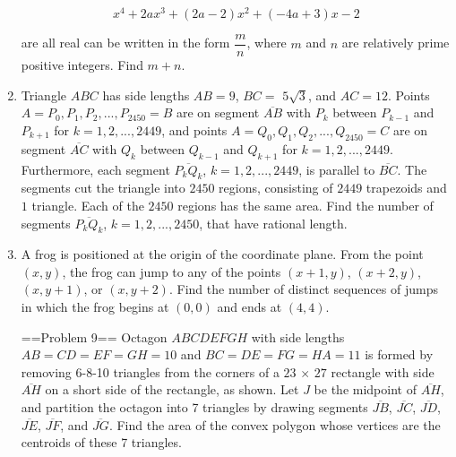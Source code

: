 \documentclass{article}
\begin{document}
\begin{enumerate}[label=\arabic*., itemsep=0.5em]
\begin{equation*}
x^4 + 2ax^3 + (2a - 2)x^2 + (-4a + 3)x - 2
\end{equation*}


are all real can be written in the form $\dfrac{m}{n}$, where $m$ and $n$ are relatively prime positive integers. Find $m + n$.\par \vspace{0.5em}\item Triangle $ABC$ has side lengths $AB = 9$, $BC =$ $5\sqrt{3}$, and $AC = 12$. Points $A = P_{0}, P_{1}, P_{2}, ... , P_{2450} = B$ are on segment $\overline{AB}$ with $P_{k}$ between $P_{k-1}$ and $P_{k+1}$ for $k = 1, 2, ..., 2449$, and points $A = Q_{0}, Q_{1}, Q_{2}, ... , Q_{2450} = C$ are on segment $\overline{AC}$ with $Q_{k}$ between $Q_{k-1}$ and $Q_{k+1}$ for $k = 1, 2, ..., 2449$. Furthermore, each segment $\overline{P_{k}Q_{k}}$, $k = 1, 2, ..., 2449$, is parallel to $\overline{BC}$. The segments cut the triangle into $2450$ regions, consisting of $2449$ trapezoids and $1$ triangle. Each of the $2450$ regions has the same area. Find the number of segments $\overline{P_{k}Q_{k}}$, $k = 1, 2, ..., 2450$, that have rational length.\par \vspace{0.5em}\item A frog is positioned at the origin of the coordinate plane. From the point $(x, y)$, the frog can jump to any of the points $(x + 1, y)$, $(x + 2, y)$, $(x, y + 1)$, or $(x, y + 2)$. Find the number of distinct sequences of jumps in which the frog begins at $(0, 0)$ and ends at $(4, 4)$.



==Problem 9== 
Octagon $ABCDEFGH$ with side lengths $AB = CD = EF = GH = 10$ and $BC = DE = FG = HA = 11$ is formed by removing 6-8-10 triangles from the corners of a $23$ $\times$ $27$ rectangle with side $\overline{AH}$ on a short side of the rectangle, as shown. Let $J$ be the midpoint of $\overline{AH}$, and partition the octagon into 7 triangles by drawing segments $\overline{JB}$, $\overline{JC}$, $\overline{JD}$, $\overline{JE}$, $\overline{JF}$, and $\overline{JG}$. Find the area of the convex polygon whose vertices are the centroids of these 7 triangles.



\end{enumerate}
\end{document}
